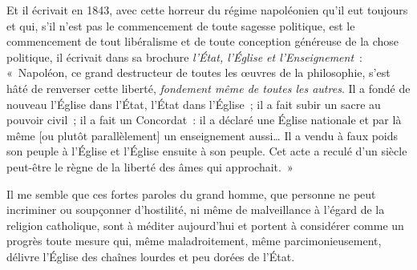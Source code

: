 \documentclass[french,twoside]{book} %
\newcommand{\astertri}{\medskip\par\centerline{\color{rubric}\large\selectfont{\syms ✻\,✻\,✻}}\medskip\par}%
\begin{document}
Et il écrivait en 1843, avec cette horreur du régime napoléonien qu’il eut toujours et qui, s’il n’est pas le commencement de toute sagesse politique, est le commencement de tout libéralisme et de toute conception généreuse de la chose politique,  il écrivait dans sa brochure \emph{l’État, l’Église et l’Enseignement} : « Napoléon, ce grand destructeur de toutes les œuvres de la philosophie, s’est hâté de renverser cette liberté, {\itshape fondement même de toutes les autres}. Il a fondé de nouveau l’Église dans l’État, l’État dans l’Église ; il a fait subir un sacre au pouvoir civil ; il a fait un Concordat : il a déclaré une Église nationale et par là même [ou plutôt parallèlement] un enseignement aussi… Il a vendu à faux poids son peuple à l’Église et l’Église ensuite à son peuple. Cet acte a reculé d’un siècle peut-être le règne de la liberté des âmes qui approchait. »\par
Il me semble que ces fortes paroles du grand homme, que personne ne peut incriminer ou soupçonner d’hostilité, ni même de malveillance à l’égard de la religion catholique, sont à méditer aujourd’hui et portent à considérer comme un progrès toute mesure qui, même maladroitement, même parcimonieusement, délivre l’Église des chaînes lourdes et peu dorées de l’État.\par

\astertri
\end{document}
